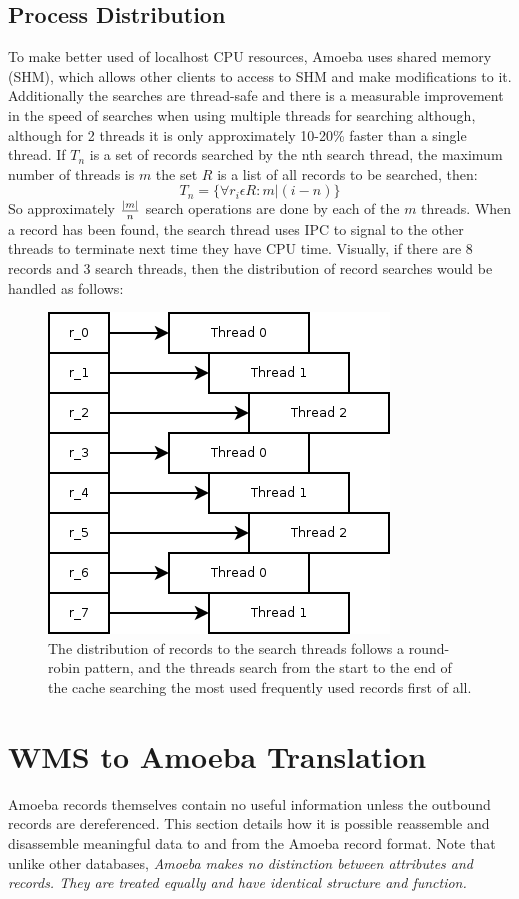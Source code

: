 \documentclass[11pt]{article}
\begin{document}
\subsection{Process Distribution}
To make better used of localhost CPU resources, Amoeba uses shared memory (SHM), which allows other clients to access to SHM and make modifications to it. Additionally the searches are thread-safe and there is a measurable improvement in the speed of searches when using multiple threads for searching although, although for 2 threads it is only approximately 10-20\% faster than a single thread.
\newline
\newline
If $T_{n}$ is a set of records searched by the nth search thread, the maximum number of threads is $m$ the set $R$ is a list of all records to be searched, then:
$$
T_n= \{\forall r_i \epsilon R: m|(i-n)\}
$$
So approximately ${|m|}\over{n}$ search operations are done by each of the $m$ threads.
\newpage
\noindent
When a record has been found, the search thread uses IPC to signal to the other threads to terminate next time they have CPU time. Visually, if there are 8 records and 3 search threads, then the distribution of record searches would be handled as follows:
\begin{figure}[ht]
\centering
\includegraphics[scale=0.6]{SearchThreads1.png}
\caption{The distribution of records to the search threads follows a round-robin pattern, and the threads search from the start to the end of the cache searching the most used frequently used records first of all.}
\end{figure}
\newpage
\noindent
\section{WMS to Amoeba Translation}
Amoeba records themselves contain no useful information unless the outbound records are dereferenced. This section details how it is possible reassemble and disassemble meaningful data to and from the Amoeba record format. Note that unlike other databases, \emph{Amoeba makes no distinction between attributes and records. They are treated equally and have identical structure and function.}
\end{document}
